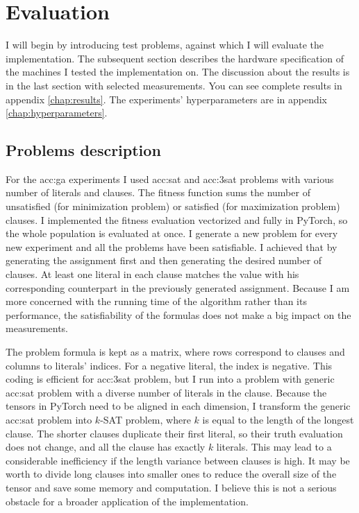 \chapter{Evaluation}

I will begin by introducing test problems, against which I will evaluate the implementation. The subsequent section describes the hardware specification of the machines I tested the implementation on. The discussion about the results is in the last section with selected measurements. You can see complete results in appendix \ref{chap:results}. The experiments' hyperparameters are in appendix \ref{chap:hyperparameters}.




\section{Problems description}
\label{chap:problems}

For the \acrlong{acc:ga} experiments I used \acrshort{acc:sat} and \acrshort{acc:3sat} problems with various number of literals and clauses. The fitness function sums the number of unsatisfied (for minimization problem) or satisfied (for maximization problem) clauses. I implemented the fitness evaluation vectorized and fully in PyTorch, so the whole population is evaluated at once. I generate a new problem for every new experiment and all the problems have been satisfiable. I achieved that by generating the assignment first and then generating the desired number of clauses. At least one literal in each clause matches the value with his corresponding counterpart in the previously generated assignment. Because I am more concerned with the running time of the algorithm rather than its performance, the satisfiability of the formulas does not make a big impact on the measurements.

The problem formula is kept as a matrix, where rows correspond to clauses and columns to literals' indices. For a negative literal, the index is negative. This coding is efficient for \acrshort{acc:3sat} problem, but I run into a problem with generic \acrshort{acc:sat} problem with a diverse number of literals in the clause. Because the tensors in PyTorch need to be aligned in each dimension, I transform the generic \acrshort{acc:sat} problem into $k$-SAT problem, where $k$ is equal to the length of the longest clause. The shorter clauses duplicate their first literal, so their truth evaluation does not change, and all the clause has exactly $k$ literals. This may lead to a considerable inefficiency if the length variance between clauses is high. It may be worth to divide long clauses into smaller ones to reduce the overall size of the tensor and save some memory and computation. I believe this is not a serious obstacle for a broader application of the implementation.

